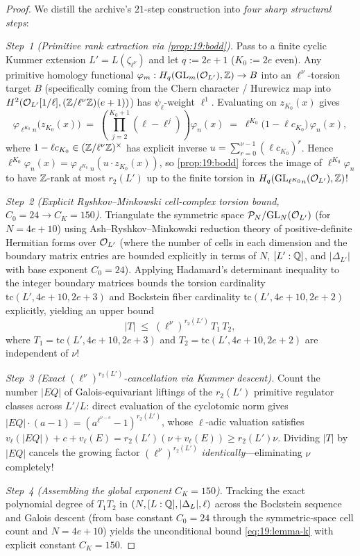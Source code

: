 \begin{proof}
We distill the archive's $21$-step construction into \emph{four sharp structural steps}:

\emph{Step~1 (Primitive rank extraction via \cref{prop:19:bodd}).}
Pass to a finite cyclic Kummer extension $L' = L(\zeta_{\ell^\nu})$ and let $q := 2e + 1$ ($K_0 := 2e$ even). Any primitive homology functional $\varphi_m : H_q(\mathrm{GL}_m(\mathcal{O}_{L'}), \mathbb{Z}) \to B$ into an $\ell^\nu$-torsion target $B$ (specifically coming from the Chern character / Hurewicz map into $H^2(\mathcal{O}_{L'}[1/\ell], (\mathbb{Z}/\ell^\nu\mathbb{Z})(e+1))$) has $\psi_\ell$-weight $\ell^1$. Evaluating on $z_{K_0}(x)$ gives
\[
  \varphi_{\ell^{K_0} n}\bigl(z_{K_0}(x)\bigr)
  \;=\; \left(\prod_{j = 2}^{K_0 + 1} (\ell - \ell^j)\right)\varphi_n(x)
  \;=\; \ell^{K_0}\bigl(1 - \ell c_{K_0}\bigr)\,\varphi_n(x),
\]
where $1 - \ell c_{K_0} \in (\mathbb{Z}/\ell^\nu\mathbb{Z})^\times$ has explicit inverse $u = \sum_{r=0}^{\nu-1} (\ell c_{K_0})^r$. Hence $\ell^{K_0}\varphi_n(x) = \varphi_{\ell^{K_0} n}(u\cdot z_{K_0}(x))$, so \cref{prop:19:bodd} forces the image of $\ell^{K_0}\varphi_n$ to have $\mathbb{Z}$-rank at most $r_2(L')$ up to the finite torsion in $H_q(\mathrm{GL}_{\ell^{K_0} n}(\mathcal{O}_{L'}), \mathbb{Z})$!

\emph{Step~2 (Explicit Ryshkov--Minkowski cell-complex torsion bound, $C_0 = 24 \to C_K = 150$).}
Triangulate the symmetric space $\mathcal{P}_N / \mathrm{GL}_N(\mathcal{O}_{L'})$ (for $N = 4e + 10$) using Ash--Ryshkov--Minkowski reduction theory of positive-definite Hermitian forms over $\mathcal{O}_{L'}$ (where the number of cells in each dimension and the boundary matrix entries are bounded explicitly in terms of $N$, $[L':\mathbb{Q}]$, and $|\Delta_{L'}|$ with base exponent $C_0 = 24$). Applying Hadamard's determinant inequality to the integer boundary matrices bounds the torsion cardinality $\mathrm{tc}(L', 4e+10, 2e+3)$ and Bockstein fiber cardinality $\mathrm{tc}(L', 4e+10, 2e+2)$ explicitly, yielding an upper bound
\[
  |T| \;\le\; (\ell^\nu)^{r_2(L')}\, T_1\, T_2,
\]
where $T_1 = \mathrm{tc}(L', 4e+10, 2e+3)$ and $T_2 = \mathrm{tc}(L', 4e+10, 2e+2)$ are independent of $\nu$!

\emph{Step~3 (Exact $(\ell^\nu)^{r_2(L')}$-cancellation via Kummer descent).}
Count the number $|EQ|$ of Galois-equivariant liftings of the $r_2(L')$ primitive regulator classes across $L'/L$: direct evaluation of the cyclotomic norm gives $|EQ|\cdot(a - 1) = (a^{\ell^{\nu - c}} - 1)^{r_2(L')}$, whose $\ell$-adic valuation satisfies $v_\ell(|EQ|) + c + v_\ell(E) = r_2(L')(\nu + v_\ell(E)) \ge r_2(L')\nu$. Dividing $|T|$ by $|EQ|$ cancels the growing factor $(\ell^\nu)^{r_2(L')}$ \emph{identically}—eliminating $\nu$ completely!

\emph{Step~4 (Assembling the global exponent $C_K = 150$).}
Tracking the exact polynomial degree of $T_1 T_2$ in $(N, [L:\mathbb{Q}], |\Delta_L|, \ell)$ across the Bockstein sequence and Galois descent (from base constant $C_0 = 24$ through the symmetric-space cell count and $N = 4e + 10$) yields the unconditional bound \eqref{eq:19:lemma-k} with explicit constant $C_K = 150$.
\end{proof}

